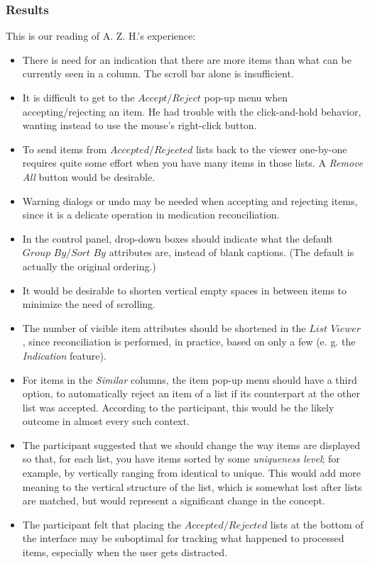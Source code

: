 \documentclass{chi2009}
\newcommand{\ListViewer}{\textit{List Viewer}}
\newcommand{\AcceptReject}{\textit{Accept/Reject}}
\newcommand{\AcceptedRejected}{\textit{Accepted/Rejected}}
\newcommand{\GroupBy}{\textit{Group By}}
\newcommand{\SortBy}{\textit{Sort By}}
\begin{document}
\subsubsection{Results}
This is our reading of A. Z. H.'s experience:
\begin{itemize}
\item There is need for an indication that there are more items than what can be currently seen in a column. The scroll bar alone is insufficient.
\item It is difficult to get to the $\AcceptReject$ pop-up menu when accepting/rejecting an item. He had trouble with the click-and-hold behavior, wanting instead to use the mouse's right-click button.
\item To send items from $\AcceptedRejected$ lists back to the viewer one-by-one requires quite some effort when you have many items in those lists. A \textit{Remove All} button would be desirable.
\item Warning dialogs or undo may be needed when accepting and rejecting items, since it is a delicate operation in medication reconciliation.
\item In the control panel, drop-down boxes should indicate what the default $\GroupBy$/$\SortBy$ attributes are, instead of blank captions. (The default is actually the original ordering.)
\item It would be desirable to shorten vertical empty spaces in between items to minimize the need of scrolling.
\item The number of visible item attributes should be shortened in the $\ListViewer$, since reconciliation is performed, in practice, based on only a few (e. g. the \textit{Indication} feature).
\item For items in the \textit{Similar} columns, the item pop-up menu should have a third option, to automatically reject an item of a list if its counterpart at the other list was accepted. According to the participant, this would be the likely outcome in almost every such context.
\item The participant suggested that we should change the way items are displayed so that, for each list, you have items sorted by some \textit{uniqueness level}; for example, by vertically ranging from identical to unique. This would add more meaning to the vertical structure of the list, which is somewhat lost after lists are matched, but would represent a significant change in the concept.
\item The participant felt that placing the $\AcceptedRejected$ lists at the bottom of the interface may be suboptimal for tracking what happened to processed items, especially when the user gets distracted.

\end{itemize}
\end{document}
